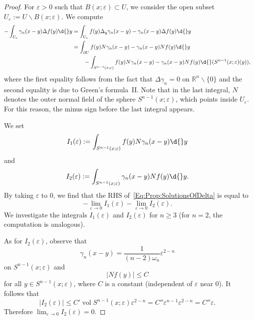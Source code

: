 \documentclass[12pt, oneside, a4paper]{article}
\def\vol{\operatorname{vol}}
\theoremstyle{dfn}
\def\Rbb{\ensuremath{\mathbb{R}}}
\providecommand{\abs}[1]{\lvert#1\rvert}
\begin{document}
\begin{proof}
For $\varepsilon > 0$ such that $B(x;\varepsilon) \subset U$, we consider the open subset $U_\varepsilon := U \smallsetminus B(x;\varepsilon)$. We compute
\begin{align*}
	-\int_{U_\varepsilon} \gamma_n(x-y) \Delta f(y) \d{}y
	&= \int_{U_\varepsilon} f(y) \Delta_y \gamma_n(x-y) - \gamma_n(x-y) \Delta f(y) \d{}y \\
	&= \int_{\partial U} f(y) N\gamma_n(x-y) - \gamma_n(x-y) Nf(y) \d{}y \\
	&\qquad - \int_{S^{n-1}(x;\varepsilon)} f(y) N\gamma_n(x-y) - \gamma_n(x-y) Nf(y) \d{}(S^{n-1}(x;\varepsilon)(y)),
\end{align*}
where the first equality follows from the fact that $\Delta \gamma_n = 0$ on $\Rbb^n \smallsetminus \{0\}$ and the second equality is due to Green's formula~II. Note that in the last integral, $N$ denotes the outer normal field of the sphere $S^{n-1}(x;\varepsilon)$, which points inside $U_\varepsilon$. For this reason, the minus sign before the last integral appears.

We set
\[
I_1(\varepsilon) := \int_{S^{n-1}(x;\varepsilon)} f(y)  N\gamma_n(x-y)\d{}y
\]
and
\[
I_2(\varepsilon) := \int_{S^{n-1}(x;\varepsilon)} \gamma_n(x-y) Nf(y) \d{}y.
\]
By taking $\varepsilon$ to $0$, we find that the RHS of~\eqref{Eq:Prop:SolutionsOfDelta} is equal to
\[
- \lim_{\varepsilon \to 0} I_1(\varepsilon) - \lim_{\varepsilon \to 0} I_2(\varepsilon).
\]
We investigate the integrals $I_1(\varepsilon)$ and $I_2(\varepsilon)$ for $n \geqslant 3$ (for $n = 2$, the computation is analogous).

As for $I_2(\varepsilon)$, observe that
\[
\gamma_n(x-y) = \frac{1}{(n-2) \omega_n} \varepsilon^{2-n}
\]
on $S^{n-1}(x;\varepsilon)$ and
\[
\abs{N f(y)} \leqslant C
\]
for all $y \in S^{n-1}(x;\varepsilon)$, where $C$ is a constant (independent of $\varepsilon$ near $0$). It follows that
\[
\abs{I_2(\varepsilon)} \leqslant C' \vol S^{n-1}(x;\varepsilon) \varepsilon^{2-n} = C'' \varepsilon^{n-1} \varepsilon^{2-n} = C'' \varepsilon.
\]
Therefore $\lim_{\varepsilon \to 0} I_2(\varepsilon) = 0$.


\end{proof}
\end{document}
